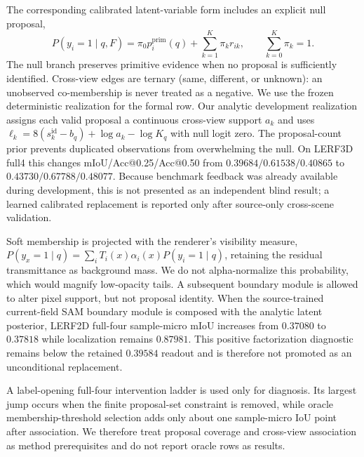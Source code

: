 \documentclass[journal,twoside]{IEEEtran}
\begin{document}
The corresponding calibrated latent-variable form includes an explicit null
proposal,
\begin{equation}
 P(y_i=1\mid q,F)=\pi_0 p_i^{\mathrm{prim}}(q)
 +\sum_{k=1}^{K}\pi_k r_{ik},\qquad \sum_{k=0}^{K}\pi_k=1.
\end{equation}
The null branch preserves primitive evidence when no proposal is sufficiently
identified.  Cross-view edges are ternary (same, different, or unknown): an
unobserved co-membership is never treated as a negative.  We use the frozen
deterministic realization for the formal row.  Our analytic development
realization assigns each valid proposal a continuous cross-view support
$a_k$ and uses
$\ell_k=8(s_k^{\mathrm{id}}-b_q)+\log a_k-\log K_q$ with null logit zero.
The proposal-count prior prevents duplicated observations from overwhelming
the null.  On LERF3D full4 this changes mIoU/Acc@0.25/Acc@0.50 from
$0.39684/0.61538/0.40865$ to $0.43730/0.67788/0.48077$.  Because benchmark
feedback was already available during development, this is not presented as
an independent blind result; a learned calibrated replacement is reported
only after source-only cross-scene validation.

Soft membership is projected with the renderer's visibility measure,
$P(y_x=1\mid q)=\sum_iT_i(x)\alpha_i(x)P(y_i=1\mid q)$, retaining the residual
transmittance as background mass.  We do not alpha-normalize this probability,
which would magnify low-opacity tails.  A subsequent boundary module is allowed
to alter pixel support, but not proposal identity.
When the source-trained current-field SAM boundary module is composed with the
analytic latent posterior, LERF2D full-four sample-micro mIoU increases from
$0.37080$ to $0.37818$ while localization remains $0.87981$.  This positive
factorization diagnostic remains below the retained $0.39584$ readout and is
therefore not promoted as an unconditional replacement.

A label-opening full-four intervention ladder is used only for diagnosis.  Its
largest jump occurs when the finite proposal-set constraint is removed, while
oracle membership-threshold selection adds only about one sample-micro IoU
point after association.  We therefore treat proposal coverage and cross-view
association as method prerequisites and do not report oracle rows as results.
\end{document}
